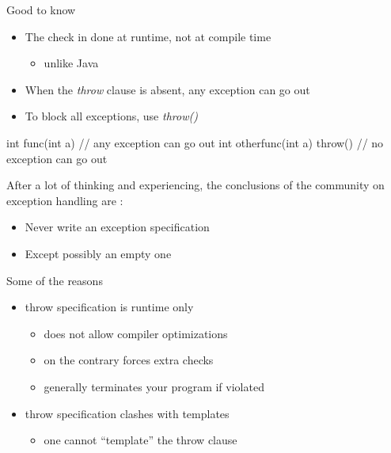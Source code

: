 \begin{frame}[fragile]
  \begin{block}{Good to know}
    \begin{itemize}
    \item The check in done at runtime, not at compile time
      \begin{itemize}
      \item unlike Java
      \end{itemize}
    \item When the {\it throw} clause is absent, any exception can go out
    \item To block all exceptions, use {\it throw()}
    \end{itemize}
  \end{block}
  \pause
  \begin{cppcode}
    int func(int a) {
      // any exception can go out
    }
    int otherfunc(int a) throw() {
      // no exception can go out
    }
  \end{cppcode}
\end{frame}  

\begin{frame}[fragile]
  \begin{block}{}
    After a lot of thinking and experiencing, the conclusions of the community on exception handling are :
    \begin{itemize}
    \item Never write an exception specification
    \item Except possibly an empty one
    \end{itemize}
  \end{block}
  \pause
  \begin{alertblock}{Some of the reasons}
    \begin{itemize}
    \item throw specification is runtime only
      \begin{itemize}
      \item does not allow compiler optimizations
      \item on the contrary forces extra checks
      \item generally terminates your program if violated
      \end{itemize}
    \item throw specification clashes with templates
      \begin{itemize}
      \item one cannot ``template'' the throw clause
      \end{itemize}
    \end{itemize}
  \end{alertblock}
\end{frame}

